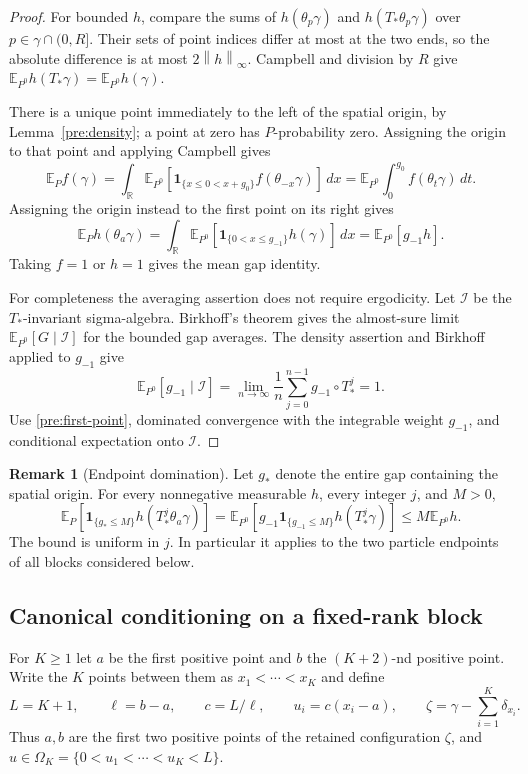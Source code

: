 \documentclass[11pt,reqno]{amsart}
\numberwithin{equation}{section}
\theoremstyle{definition}
\newtheorem{remark}[theorem]{Remark}
\newcommand{\R}{\mathbb R}
\newcommand{\E}{\mathbb E}
\newcommand{\1}{\mathbf 1}
\newcommand{\dd}{\,d}
\newcommand{\norm}[1]{\left\lVert#1\right\rVert}
\begin{document}
\begin{proof}
For bounded $h$, compare the sums of $h(\theta_p\gamma)$ and
$h(T_*\theta_p\gamma)$ over $p\in\gamma\cap(0,R]$. Their sets of
point indices differ at most at the two ends, so the absolute
difference is at most $2\norm h_\infty$. Campbell and division by $R$
give $\E_{P^0}h(T_*\gamma)=\E_{P^0}h(\gamma)$.

There is a unique point immediately to the left of the spatial
origin, by Lemma~\ref{pre:density}; a point at zero has $P$-probability
zero. Assigning the origin to that point and applying Campbell gives
\[
\E_P f(\gamma)
=\int_{\R}\E_{P^0}
 [\1_{\{x\le0<x+g_0\}}f(\theta_{-x}\gamma)]\dd x
=\E_{P^0}\int_0^{g_0}f(\theta_t\gamma)\dd t.
\]
Assigning the origin instead to the first point on its right gives
\[
\E_P h(\theta_a\gamma)
=\int_{\R}\E_{P^0}
 [\1_{\{0<x\le g_{-1}\}}h(\gamma)]\dd x
=\E_{P^0}[g_{-1}h].
\]
Taking $f=1$ or $h=1$ gives the mean gap identity.

For completeness the averaging assertion does not require ergodicity.
Let $\mathcal I$ be the $T_*$-invariant sigma-algebra. Birkhoff's
theorem gives the almost-sure limit
$\E_{P^0}[G\mid\mathcal I]$ for the bounded gap averages.
The density assertion and Birkhoff applied to $g_{-1}$ give
\[
\E_{P^0}[g_{-1}\mid\mathcal I]
=\lim_{n\to\infty}\frac1n\sum_{j=0}^{n-1}g_{-1}\circ T_*^j=1.
\]
Use \eqref{pre:first-point}, dominated convergence with the integrable
weight $g_{-1}$, and conditional expectation onto $\mathcal I$.
\end{proof}

\begin{remark}[Endpoint domination]\label{pre:domination}
Let $g_*$ denote the entire gap containing the spatial origin.
For every nonnegative measurable $h$, every integer $j$, and $M>0$,
\begin{equation}\label{pre:domination-equation}
\E_P[\1_{\{g_*\le M\}}h(T_*^j\theta_a\gamma)]
=\E_{P^0}[g_{-1}\1_{\{g_{-1}\le M\}}h(T_*^j\gamma)]
\le M\E_{P^0}h.
\end{equation}
The bound is uniform in $j$. In particular it applies to the two
particle endpoints of all blocks considered below.
\end{remark}

\subsection{Canonical conditioning on a fixed-rank block}

For $K\ge1$ let $a$ be the first positive point and $b$ the
$(K+2)$-nd positive point. Write the $K$ points between them as
$x_1<\cdots<x_K$ and define
\[
L=K+1,\qquad \ell=b-a,\qquad c=L/\ell,\qquad
u_i=c(x_i-a),\qquad
\zeta=\gamma-\sum_{i=1}^K\delta_{x_i}.
\]
Thus $a,b$ are the first two positive points of the retained
configuration $\zeta$, and $u\in\Omega_K=\{0<u_1<\cdots<u_K<L\}$.
\end{document}
